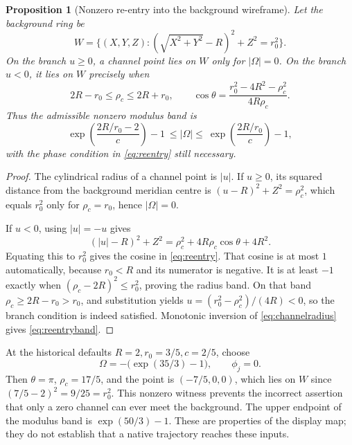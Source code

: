 \documentclass[11pt,a4paper]{article}
\newtheorem{proposition}[theorem]{Proposition}
\theoremstyle{definition}
\theoremstyle{remark}
\begin{document}
\par\noindent\begin{minipage}{\linewidth}
\begin{proposition}[Nonzero re-entry into the background wireframe]
\label{prop:reentry}
Let the background ring be
\[
 W=\{(X,Y,Z):(\sqrt{X^2+Y^2}-R)^2+Z^2=r_0^2\}.
 \]
On the branch $u\geq0$, a channel point lies on $W$ only for
$|\Omega|=0$. On the branch $u<0$, it lies on $W$ precisely
when
\begin{equation}
 2R-r_0\leq\rho_c\leq2R+r_0,\qquad
 \cos\theta=\frac{r_0^2-4R^2-\rho_c^2}{4R\rho_c}.
 \label{eq:reentry}
\end{equation}
Thus the admissible nonzero modulus band is
\begin{equation}
 \exp\left(\frac{2R/r_0-2}{c}\right)-1
 \ \leq |\Omega|\leq\
 \exp\left(\frac{2R/r_0}{c}\right)-1,
 \label{eq:reentryband}
\end{equation}
with the phase condition in \eqref{eq:reentry} still necessary.
\end{proposition}
\end{minipage}\par
\begin{proof}
The cylindrical radius of a channel point is $|u|$. If
$u\geq0$, its squared distance from the background meridian
centre is $(u-R)^2+Z^2=\rho_c^2$, which equals $r_0^2$
only for $\rho_c=r_0$, hence $|\Omega|=0$.

If $u<0$, using $|u|=-u$ gives
\[
 (|u|-R)^2+Z^2
 =\rho_c^2+4R\rho_c\cos\theta+4R^2.
 \]
Equating this to $r_0^2$ gives the cosine in
\eqref{eq:reentry}. That cosine is at most $1$ automatically,
because $r_0<R$ and its numerator is negative. It is at
least $-1$ exactly when
$(\rho_c-2R)^2\leq r_0^2$, proving the radius band.
On that band $\rho_c\geq2R-r_0>r_0$, and substitution yields
$u=(r_0^2-\rho_c^2)/(4R)<0$, so the branch condition is
indeed satisfied. Monotonic inversion of
\eqref{eq:channelradius} gives \eqref{eq:reentryband}.
\end{proof}

At the historical defaults $R=2,r_0=3/5,c=2/5$, choose
\begin{equation}
 \Omega=-\bigl(\exp(35/3)-1\bigr),\qquad \phi_j=0.
 \label{eq:channelwitness}
\end{equation}
Then $\theta=\pi$, $\rho_c=17/5$, and the point is
$(-7/5,0,0)$, which lies on $W$ since
$(7/5-2)^2=9/25=r_0^2$. This nonzero witness prevents the
incorrect assertion that only a zero channel can ever meet
the background. The upper endpoint of the modulus band is
$\exp(50/3)-1$. These are properties of the display map;
they do not establish that a native trajectory reaches these
inputs.
\end{document}
